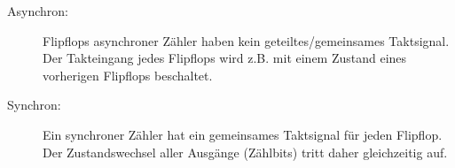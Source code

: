 \begin{description}
  \item[Asynchron:]
    Flipflops asynchroner Zähler haben kein geteiltes/gemeinsames Taktsignal. Der Takteingang
jedes Flipflops wird z.B. mit einem Zustand eines vorherigen Flipflops
beschaltet.

  \item[Synchron:]
    Ein synchroner Zähler hat ein gemeinsames Taktsignal für jeden Flipflop. Der
    Zustandswechsel aller Ausgänge (Zählbits) tritt daher gleichzeitig auf.
\end{description}